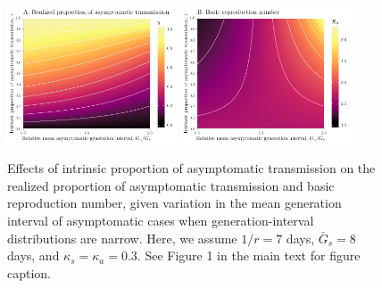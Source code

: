 \documentclass[12pt]{article}
\begin{document}
\begin{figure}[!ht]
\begin{center}
\includegraphics[width=0.45\textwidth]{../figheatmap_03.pdf}
\mbox{\hspace{0.05\textwidth}}
\includegraphics[width=0.45\textwidth]{../figheatmap_R0_03.pdf}
\caption{Effects of intrinsic proportion of asymptomatic transmission on the realized proportion of asymptomatic transmission and basic reproduction number, given variation in
the mean generation interval of asymptomatic cases when generation-interval distributions are narrow. 
Here, we assume $1/r=7$ days, $\bar G_s=8$ days, and $\kappa_s=\kappa_a=0.3$.
See Figure 1 in the main text for figure caption.
}
\end{center}
\end{figure}

\pagebreak
\end{document}
